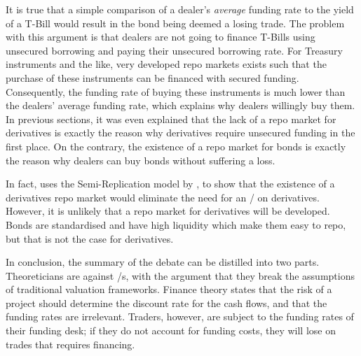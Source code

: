 \documentclass[main.tex]{subfiles}
\begin{document}
            It is true that a simple comparison of a dealer's \textit{average} funding rate
            to the yield of a T-Bill would result in the bond being deemed a losing trade.
            The problem with this argument is that dealers are not going to finance T-Bills
            using unsecured borrowing and paying their unsecured borrowing rate.
            For Treasury instruments and the like,
            very developed repo markets exists such that 
            the purchase of these instruments can be financed with secured funding.
            Consequently, the funding rate of buying these instruments is much lower 
            than the dealers' average funding rate,
            which explains why dealers willingly buy them.
            In previous sections, it was even explained that
            the lack of a repo market for derivatives is exactly the reason 
            why derivatives require unsecured funding in the first place.
            On the contrary, the existence of a repo market for bonds is exactly the reason
            why dealers can buy bonds without suffering a loss.

            In fact, \textcite{Green2015XVA}
            uses the Semi-Replication model by \textcite{BurgardKjaer2013Funding},
            to show that the existence of a derivatives repo market
            would eliminate the need for an \FVA/ on derivatives. 
            However, it is unlikely that a repo market for derivatives will be developed.
            Bonds are standardised and have high liquidity which make them easy to repo,
            but that is not the case for derivatives.

        In conclusion, the summary of the debate can be distilled into two parts.
        Theoreticians are against \FVA/s, 
        with the argument that they break the assumptions of traditional valuation frameworks.
        Finance theory states that the risk of a project 
        should determine the discount rate for the cash flows, 
        and that the funding rates are irrelevant.
        Traders, however, are subject to the funding rates of their funding desk;
        if they do not account for funding costs, they will lose on trades that requires financing.
\end{document}
